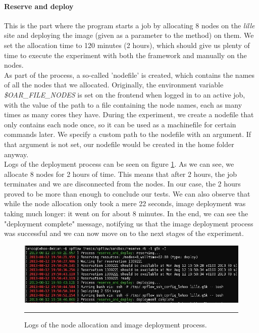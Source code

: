 \paragraph{Reserve and deploy}
This is the part where the program starts a job by allocating 8 nodes
on the \emph{lille} site and deploying the image (given as a parameter
to the method) on them. We set the allocation time to 120 minutes (2
hours), which should give us plenty of time to execute the experiment
with both the framework and manually on the nodes.\\
As part of the process, a so-called 'nodefile' is created, which
contains the names of all the nodes that we allocated. Originally, the
environment variable \emph{\$OAR\_FILE\_NODES} is set on the frontend
when logged in to an active job, with the value of the path to a file
containing the node names, each as many times as many cores they
have. During the experiment, we create a nodefile that only contains
each node once, so it can be used as a machinefile for certain
commands later. We specify a custom path to the nodefile with an
argument. If that argument is not set, our nodefile would be created
in the home folder anyway.\\
Logs of the deployment process can be seen on
figure \ref{fig:fex_deployment}. As we can see, we allocate 8 nodes
for 2 hours of time. This means that after 2 hours, the job terminates
and we are disconnected from the nodes. In our case, the 2 hours
proved to be more than enough to conclude our tests. We can also
observe that while the node allocation only took a mere 22 seconds,
image deployment was taking much longer: it went on for about 8
minutes. In the end, we can see the "deployment complete" message,
notifying us that the image deployment process was successful and we
can now move on to the next stages of the experiment.

\begin{figure}[htbp]
  \centering
    \includegraphics[scale=0.6]{./Figures/fex_deployment.jpg}
    \rule{35em}{0.5pt}
  \caption[Allocation and deployment]{Logs of the node allocation and
    image deployment process.}
  \label{fig:fex_deployment}
\end{figure}

